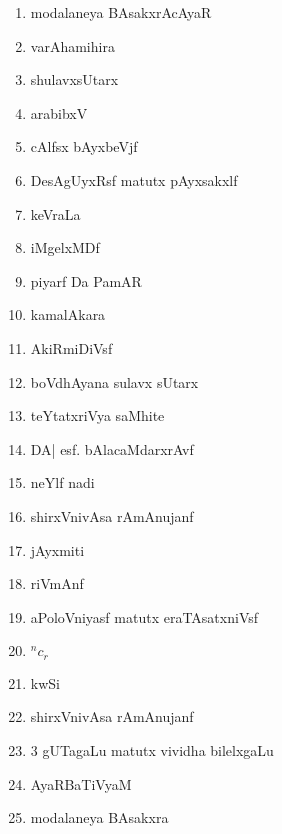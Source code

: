 \begin{enumerate}
\item modalaneya BAsakxrAcAyaR

\item varAhamihira

\item shulavxsUtarx

\item arabibxV

\item cAlfsx bAyxbeVjf

\item DesAgUyxRsf matutx pAyxsakxlf

\item keVraLa

\item iMgelxMDf

\item piyarf Da PamAR

\item kamalAkara

\item AkiRmiDiVsf

\item boVdhAyana sulavx sUtarx

\item teYtatxriVya saMhite

\item DA| esf. bAlacaMdarxrAvf

\item neYlf nadi

\item shirxVnivAsa rAmAnujanf

\item jAyxmiti

\item riVmAnf

\item aPoloVniyasf matutx eraTAsatxniVsf

\item ${}^nc_r$

\item kwSi

\item shirxVnivAsa rAmAnujanf

\item $3$ gUTagaLu matutx vividha bilelxgaLu

\item AyaRBaTiVyaM

\item modalaneya BAsakxra


\end{enumerate}
